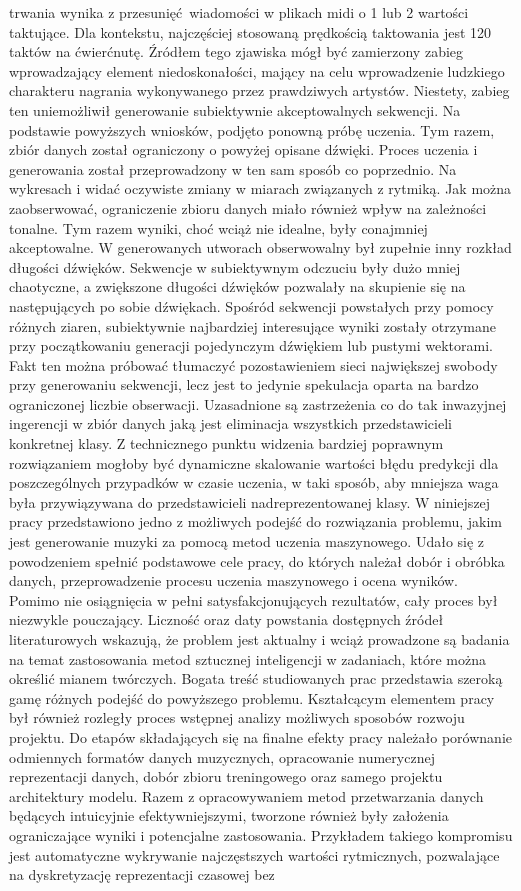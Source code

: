 trwania wynika z przesunięć wiadomości w plikach midi o 1 lub 2 wartości taktujące. Dla kontekstu, najczęściej stosowaną prędkością taktowania jest 120 taktów na ćwierćnutę. Źródłem tego zjawiska mógł być zamierzony  zabieg wprowadzający element niedoskonałości, mający na celu wprowadzenie ludzkiego charakteru nagrania  wykonywanego przez prawdziwych artystów. Niestety, zabieg ten uniemożliwił generowanie subiektywnie akceptowalnych sekwencji. Na podstawie powyższych wniosków, podjęto ponowną próbę uczenia. Tym razem, zbiór danych został ograniczony o powyżej opisane dźwięki. Proces uczenia i generowania został przeprowadzony w ten sam sposób co poprzednio.  Na wykresach  i  widać oczywiste zmiany w miarach związanych z rytmiką.  Jak można zaobserwować, ograniczenie zbioru danych miało również wpływ na zależności tonalne. Tym razem wyniki, choć wciąż nie idealne, były conajmniej akceptowalne.  W generowanych utworach obserwowalny był zupełnie inny rozkład długości dźwięków. Sekwencje w subiektywnym odczuciu były dużo mniej chaotyczne, a zwiększone długości dźwięków pozwalały na skupienie się na następujących po sobie dźwiękach. Spośród sekwencji powstałych przy pomocy różnych ziaren, subiektywnie najbardziej interesujące wyniki zostały otrzymane przy początkowaniu generacji pojedynczym dźwiękiem lub pustymi wektorami. Fakt ten można próbować tłumaczyć pozostawieniem sieci największej swobody przy generowaniu sekwencji, lecz jest to jedynie spekulacja oparta na bardzo ograniczonej liczbie obserwacji. Uzasadnione są zastrzeżenia co do tak inwazyjnej ingerencji w zbiór danych jaką jest eliminacja  wszystkich przedstawicieli konkretnej klasy. Z technicznego punktu widzenia bardziej poprawnym  rozwiązaniem mogłoby być dynamiczne skalowanie wartości błędu predykcji dla poszczególnych przypadków w czasie uczenia,  w taki sposób, aby mniejsza waga była przywiązywana do przedstawicieli nadreprezentowanej klasy. W niniejszej pracy przedstawiono jedno z możliwych podejść do rozwiązania problemu, jakim jest generowanie muzyki za pomocą metod uczenia maszynowego.  Udało się z powodzeniem spełnić podstawowe cele pracy, do których należał dobór i obróbka danych,  przeprowadzenie procesu uczenia maszynowego i ocena wyników. Pomimo nie osiągnięcia w pełni satysfakcjonujących rezultatów, cały proces był niezwykle pouczający.  Liczność oraz daty powstania dostępnych źródeł literaturowych wskazują, że problem jest aktualny  i wciąż prowadzone są badania na temat zastosowania metod sztucznej inteligencji w zadaniach,  które można określić mianem twórczych. Bogata treść studiowanych prac przedstawia szeroką gamę  różnych podejść do powyższego problemu. Kształcącym elementem pracy był również rozległy proces wstępnej analizy możliwych sposobów rozwoju projektu. Do etapów składających się na finalne efekty pracy należało porównanie odmiennych  formatów danych muzycznych, opracowanie numerycznej reprezentacji danych, dobór zbioru treningowego oraz samego projektu architektury modelu.  Razem z opracowywaniem metod przetwarzania danych będących intuicyjnie efektywniejszymi, tworzone również były założenia ograniczające wyniki i potencjalne zastosowania. Przykładem takiego kompromisu jest automatyczne wykrywanie najczęstszych wartości rytmicznych, pozwalające na dyskretyzację reprezentacji czasowej bez 